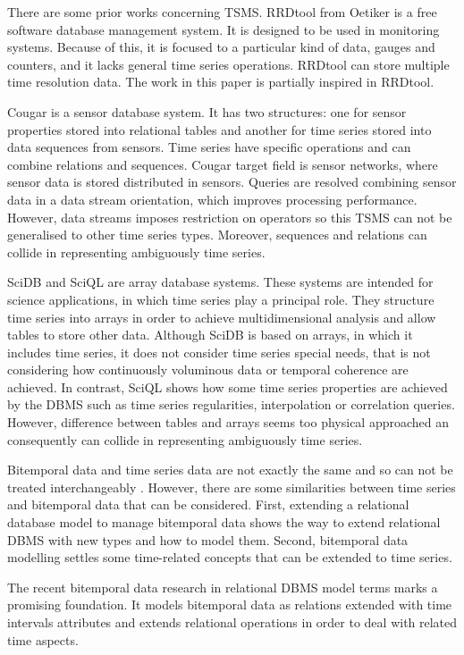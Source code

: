 There are some prior works concerning TSMS. RRDtool from Oetiker
\cite{rrdtool} is a free software database management system. It is
designed to be used in monitoring systems. Because of this, it is
focused to a particular kind of data, gauges and counters, and it
lacks general time series operations. RRDtool can store multiple time
resolution data. The work in this paper is partially inspired in
RRDtool.

Cougar \cite{bonnet01} is a sensor database system. It has two
structures: one for sensor properties stored into relational tables
and another for time series stored into data sequences from
sensors. Time series have specific operations and can combine
relations and sequences. Cougar target field is sensor networks, where
sensor data is stored distributed in sensors. Queries are resolved
combining sensor data in a data stream orientation, which improves
processing performance. However, data streams imposes restriction on
operators so this TSMS can not be generalised to other time series
types. Moreover, sequences and relations can collide in representing
ambiguously time series.


SciDB \cite{stonebraker09:scidb} and SciQL \cite{zhang11} are array
database systems. These systems are intended for science applications,
in which time series play a principal role. They structure time series
into arrays in order to achieve multidimensional analysis and allow
tables to store other data.  Although SciDB is based on arrays, in
which it includes time series, it does not consider time series
special needs, that is not considering how continuously voluminous
data or temporal coherence are achieved.  In contrast, SciQL shows how
some time series properties are achieved by the DBMS such as time
series regularities, interpolation or correlation queries.  However,
difference between tables and arrays seems too physical approached an
consequently can collide in representing ambiguously time series.


Bitemporal data and time series data are not exactly the same and so
can not be treated interchangeably \cite{schmidt95}. However, there
are some similarities between time series and bitemporal data that can
be considered. First, extending a relational database model to manage
bitemporal data shows the way to extend relational DBMS with new types
and how to model them. Second, bitemporal data modelling settles some
time-related concepts that can be extended to time series.

The recent bitemporal data research in relational DBMS model terms
\cite{date02:_tempor_data_relat_model} marks a promising
foundation. It models bitemporal data as relations extended with time
intervals attributes and extends relational operations in order to
deal with related time aspects.




